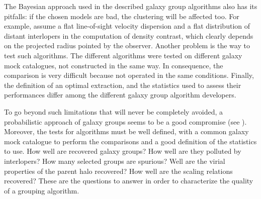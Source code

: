 The Bayesian approach used in the described galaxy group algorithms also has
its pitfalls: if the chosen models are bad, the clustering will be affected
too. For example, \citet{Yang+07} assume a flat line-of-sight velocity
dispersion and a flat distribution of distant interlopers in the computation of
density contrast, which clearly depends on the projected radius pointed by the
observer. Another problem is the way to test such algorithms. The different
algorithms were tested on different galaxy mock catalogues, not constructed in
the same way. In consequence, the comparison is very difficult because not
operated in the same conditions. Finally, the definition of an optimal
extraction, and the statistics used to assess their performances differ among
the different galaxy group algorithm developers.

To go beyond such limitations that will never be completely avoided,
a probabilistic approach of galaxy groups seems to be a good compromise (see
). Moreover, the tests for algorithms must be well
defined, with a common galaxy mock catalogue to perform the comparisons and a
good definition of the statistics to use. How well are recovered galaxy groups?
How well are they polluted by interlopers? How many selected groups are
spurious? Well are the virial properties of the parent halo recovered? How well
are the scaling
relations recovered? These are the questions to answer in order to
characterize the quality of a grouping algorithm.


